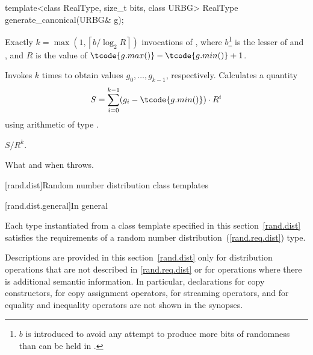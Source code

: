 %
\begin{itemdecl}
template<class RealType, size_t bits, class URBG>
 RealType generate_canonical(URBG& g);
\end{itemdecl}

\begin{itemdescr}
\pnum\complexity Exactly
 $ k = \max(1, \left\lceil b / \log_2 R \right\rceil)$
 invocations
 of ,
 where $b$\footnote{$b$ is introduced
   to avoid any attempt
   to produce more bits of randomness
   than can be held in .}
   is the lesser of 
                and ,
 and
   $R$ is the value of $ \tcode{g.max()} - \tcode{g.min()} + 1 $.

\pnum\effects
 Invokes  $k$ times
 to obtain values $ g_0, \ldots, g_{k-1} $, respectively.
 Calculates a quantity
 \[
   S = \sum_{i=0}^{k-1} (g_i - \tcode{g.min()})
                        \cdot R^i
 \]
 using arithmetic of type
 .

\pnum\returns
 $ S / R^k $.

\pnum\throws What and when  throws.
\end{itemdescr}%




[rand.dist]{Random number distribution class templates}%

[rand.dist.general]{In general}

\pnum
Each type instantiated
from a class template specified in this section~\ref{rand.dist}
satisfies the requirements
of a random number distribution~(\ref{rand.req.dist}) type.

\pnum
Descriptions are provided in this section~\ref{rand.dist}
only for distribution operations
that are not described in \ref{rand.req.dist}
or for operations where there is additional semantic information.
In particular,
declarations for copy constructors,
for copy assignment operators,
for streaming operators,
and for equality and inequality operators
are not shown in the synopses.

